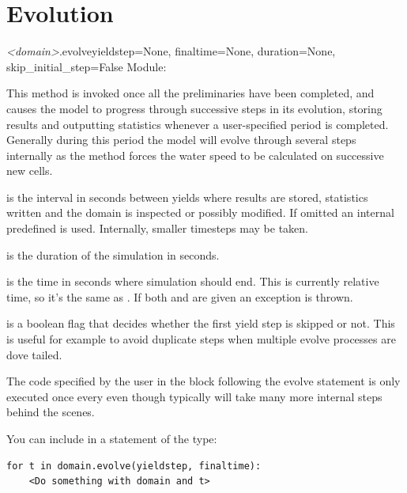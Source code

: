 \documentclass{manual}
\begin{document}
\section{Evolution}
\label{sec:evolution}

\begin{methoddesc}{\emph{<domain>}.evolve}{yieldstep=None,
                                           finaltime=None,
                                           duration=None,
                                           skip_initial_step=False}
Module: 

This method is invoked once all the
preliminaries have been completed, and causes the model to progress
through successive steps in its evolution, storing results and
outputting statistics whenever a user-specified period
 is completed.  Generally during this period the
model will evolve through several steps internally
as the method forces the water speed to be calculated
on successive new cells. 

 is the interval in seconds between yields where results are
stored, statistics written and the domain is inspected or possibly modified.
If omitted an internal predefined  is used.  Internally, smaller
timesteps may be taken.

 is the duration of the simulation in seconds.

 is the time in seconds where simulation should end. This is currently
relative time, so it's the same as .  If both  and
 are given an exception is thrown.

 is a boolean flag that decides whether the first
yield step is skipped or not. This is useful for example to avoid
duplicate steps when multiple evolve processes are dove tailed.

The code specified by the user in the block following the evolve statement is
only executed once every  even though 
\anuga typically will take many more internal steps behind the scenes.

You can include  in a statement of the type:

\begin{verbatim}
for t in domain.evolve(yieldstep, finaltime):
    <Do something with domain and t>
\end{verbatim}
\end{methoddesc}
\end{document}
